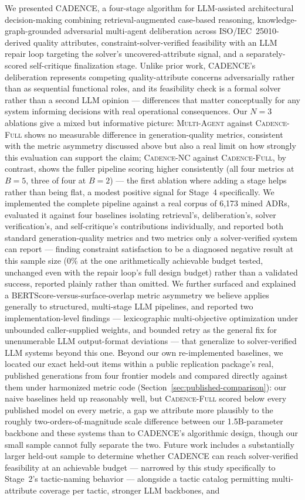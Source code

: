 \documentclass[preprint,12pt,authoryear]{elsarticle}
\newcommand{\sysMA}{\textsc{Multi-Agent}}
\newcommand{\sysNC}{\textsc{Cadence-NC}}
\newcommand{\sysFull}{\textsc{Cadence-Full}}
\renewcommand{\_}{\textunderscore\allowbreak{}}
\begin{document}
We presented CADENCE, a four-stage algorithm for LLM-assisted architectural decision-making combining retrieval-augmented case-based reasoning, knowledge-graph-grounded adversarial multi-agent deliberation across ISO/IEC~25010-derived quality attributes, constraint-solver-verified feasibility with an LLM repair loop targeting the solver's uncovered-attribute signal, and a separately-scored self-critique finalization stage. Unlike prior work, CADENCE's deliberation represents competing quality-attribute concerns adversarially rather than as sequential functional roles, and its feasibility check is a formal solver rather than a second LLM opinion --- differences that matter conceptually for any system informing decisions with real operational consequences. Our $N=3$ ablations give a mixed but informative picture: \sysMA{} against \sysFull{} shows no measurable difference in generation-quality metrics, consistent with the metric asymmetry discussed above but also a real limit on how strongly this evaluation can support the claim; \sysNC{} against \sysFull{}, by contrast, shows the fuller pipeline scoring higher consistently (all four metrics at $B=5$, three of four at $B=2$) --- the first ablation where adding a stage helps rather than being flat, a modest positive signal for Stage~4 specifically. We implemented the complete pipeline against a real corpus of 6{,}173 mined ADRs, evaluated it against four baselines isolating retrieval's, deliberation's, solver verification's, and self-critique's contributions individually, and reported both standard generation-quality metrics and two metrics only a solver-verified system can report --- finding constraint satisfaction to be a diagnosed negative result at this sample size (0\% at the one arithmetically achievable budget tested, unchanged even with the repair loop's full design budget) rather than a validated success, reported plainly rather than omitted. We further surfaced and explained a BERTScore-versus-surface-overlap metric asymmetry we believe applies generally to structured, multi-stage LLM pipelines, and reported two implementation-level findings --- lexicographic multi-objective optimization under unbounded caller-supplied weights, and bounded retry as the general fix for unenumerable LLM output-format deviations --- that generalize to solver-verified LLM systems beyond this one. Beyond our own re-implemented baselines, we located our exact held-out items within a public replication package's real, published generations from four frontier models and compared directly against them under harmonized metric code (Section~\ref{sec:published-comparison}): our naive baselines held up reasonably well, but \sysFull{} scored below every published model on every metric, a gap we attribute more plausibly to the roughly two-orders-of-magnitude scale difference between our 1.5B-parameter backbone and these systems than to CADENCE's algorithmic design, though our small sample cannot fully separate the two. Future work includes a substantially larger held-out sample to determine whether CADENCE can reach solver-verified feasibility at an achievable budget --- narrowed by this study specifically to Stage~2's tactic-naming behavior --- alongside a tactic catalog permitting multi-attribute coverage per tactic, stronger LLM backbones, and 
\end{document}
